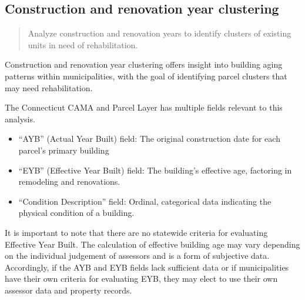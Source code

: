 \documentclass[
  letterpaper,
  DIV=11,
  numbers=noendperiod]{scrreprt}
\providecommand{\tightlist}{%
  \setlength{\itemsep}{0pt}\setlength{\parskip}{0pt}}
\begin{document}
\subsection{\texorpdfstring{\textbf{Construction and renovation year
clustering}}{Construction and renovation year clustering}}\label{construction-and-renovation-year-clustering}

\begin{quote}
Analyze construction and renovation years to identify clusters of
existing units in need of rehabilitation.
\end{quote}

Construction and renovation year clustering offers insight into building
aging patterns within municipalities, with the goal of identifying
parcel clusters that may need rehabilitation.

The Connecticut CAMA and Parcel Layer has multiple fields relevant to
this analysis.

\begin{itemize}
\tightlist
\item
  ``AYB'' (Actual Year Built) field: The original construction date for
  each parcel's primary building
\item
  ``EYB'' (Effective Year Built) field: The building's effective age,
  factoring in remodeling and renovations.
\item
  ``Condition Description'' field: Ordinal, categorical data indicating
  the physical condition of a building.
\end{itemize}

It is important to note that there are no statewide criteria for
evaluating Effective Year Built. The calculation of effective building
age may vary depending on the individual judgement of assessors and is a
form of subjective data. Accordingly, if the AYB and EYB fields lack
sufficient data or if municipalities have their own criteria for
evaluating EYB, they may elect to use their own assessor data and
property records.
\end{document}
